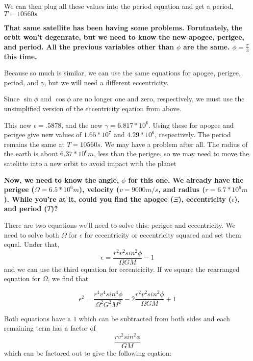 \documentclass{article}
\begin{document}
\smallskip

We can then plug all these values into the period equation and get a period, $T = 10560s$

\bigskip
\bigskip

\textbf{That same satellite has been having some problems.  Forutnately, the orbit won't degenrate, but we need to know the new apogee, perigee, and period.  All the previous variables other than $\phi$ are the same.  $\phi = \frac{\pi}{3}$ this time.}

\smallskip

Because so much is similar, we can use the same equations for apogee, perigee, period, and $\gamma$, but we will need a different eccentricity.

Since $\sin{\phi}$ and $\cos{\phi}$ are no longer one and zero, respectively, we must use the unsimplified version of the eccentricity eqation from above.

\bigskip

This new $\epsilon = .5878$, and the new $\gamma = 6.817*10^6$.  Using these for apogee and perigee give new values of $1.65*10^7$ and $4.29*10^6$, respectively.  The period remains the same at $T = 10560s$.  We may have a problem after all.  The radius of the earth is about $6.37*10^6 m$, less than the perigee, so we may need to move the satelitte into a new orbit to avoid impact with the planet

\bigskip
\bigskip

\textbf{  Now, we need to know the angle, $\phi$ for this one.  We already have the perigee ($\Omega = 6.5*10^6 m$), velocity ($v = 9000 m/s$, and radius ($r = 6.7*10^6m$).  While you're at it, could you find the apogee ($\Xi$), eccentricity ($\epsilon$), and period ($T$)?}

\smallskip

There are two equations we'll need to solve this: perigee and eccentricity.   We need to solve both $\Omega$ for $\epsilon$ for eccentricity or eccentricity squared and set them equal.  Under that, $$\epsilon = \frac{r^2v^2sin^2{\phi}}{{\Omega}GM} - 1$$ and we can use the third equation for eccentricity.  If we square the rearranged equation for $\Omega$, we find that 

$$\epsilon^2 = \frac{r^4v^4sin^4{\phi}}{{\Omega}^2G^2M^2} - 2\frac{r^2v^2sin^2{\phi}}{{\Omega}GM} + 1 $$

Both equations have a $1$ which can be subtracted from both sides and each remaining term has a factor of $$\frac{rv^2sin^2{\phi}}{GM}$$  which can be factored out to give the following eqation:
\end{document}
